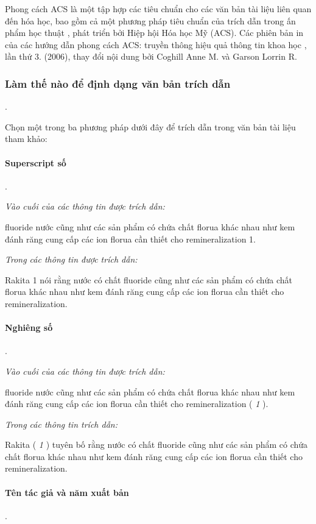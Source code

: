 \documentclass{hcmutarticle}
\begin{document}
Phong cách ACS là một tập hợp các tiêu chuẩn cho các văn bản tài liệu liên quan đến hóa học, bao gồm cả một phương pháp tiêu chuẩn của trích dẫn trong ấn phẩm học thuật , phát triển bởi Hiệp hội Hóa học Mỹ (ACS). Các phiên bản in của các hướng dẫn phong cách ACS: truyền thông hiệu quả thông tin khoa học , lần thứ 3. (2006), thay đổi nội dung bởi Coghill Anne M. và Garson Lorrin R.

\subsubsection{Làm thế nào để định dạng văn bản trích dẫn}.

Chọn một trong ba phương pháp dưới đây để trích dẫn trong văn bản tài liệu tham khảo:

\paragraph{Superscript số}.

{\em Vào cuối của các thông tin được trích dẫn:}

fluoride nước cũng như các sản phẩm có chứa chất florua khác nhau như kem đánh răng cung cấp các ion florua cần thiết cho remineralization 1.

{\em Trong các thông tin được trích dẫn:}

Rakita 1 nói rằng nước có chất fluoride cũng như các sản phẩm có chứa chất florua khác nhau như kem đánh răng cung cấp các ion florua cần thiết cho remineralization.


\paragraph{Nghiêng số}.

{\em Vào cuối của các thông tin được trích dẫn:}

fluoride nước cũng như các sản phẩm có chứa chất florua khác nhau như kem đánh răng cung cấp các ion florua cần thiết cho remineralization ( {\itshape 1} ).

{\em Trong các thông tin trích dẫn:}

Rakita ( {\itshape 1} ) tuyên bố rằng nước có chất fluoride cũng như các sản phẩm có chứa chất florua khác nhau như kem đánh răng cung cấp các ion florua cần thiết cho remineralization.


\paragraph{Tên tác giả và năm xuất bản}.
\end{document}
